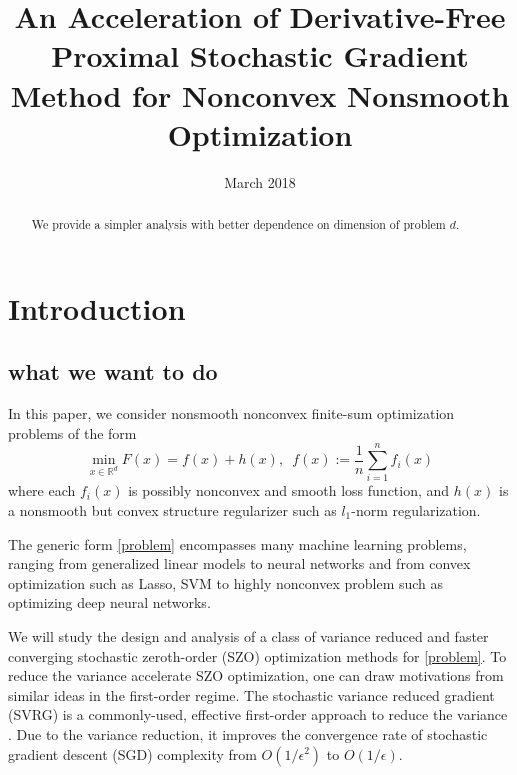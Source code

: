 \documentclass{article}
\title{An Acceleration of Derivative-Free Proximal Stochastic Gradient Method for Nonconvex Nonsmooth Optimization}
\date{March 2018}
\newcommand*{\R}{\mathbb{R}}
\theoremstyle{definition}
\theoremstyle{remark}
\begin{document}
\maketitle
\begin{abstract}
We provide a simpler analysis with better dependence on dimension of problem $d$. 
\end{abstract}

\section{Introduction}
\subsection{what we want to do}
{\color{Green}\label{problem}
{\color{Violet}
In this paper, we consider nonsmooth nonconvex finite-sum optimization problems of the form
}
\begin{equation}
\min_{x\in\R^d} F(x) =  f(x) + h(x),\,\,\,f(x):=\frac{1}{n}\sum_{i=1}^n f_i(x)
\end{equation}
where each $f_i(x)$ is {\color{Violet} possibly} nonconvex and smooth loss function, and $h(x)$ is a nonsmooth but convex structure regularizer such as $l_1$-norm regularization. }
{\color{Brown}
The generic form \eqref{problem} encompasses
many machine learning problems, ranging from generalized linear models to neural networks 
{\color{Violet} and from convex optimization such as Lasso, SVM to highly nonconvex problem such as optimizing deep neural networks.}


We will study the design and analysis of {\color{Green} a class of} variance reduced and faster converging stochastic zeroth-order (SZO) optimization methods for \eqref{problem}. To reduce the variance accelerate SZO optimization, one can draw
motivations from similar ideas in the first-order regime. The stochastic variance reduced gradient
(SVRG) is a commonly-used, effective first-order approach to reduce the variance \cite{johnson2013accelerating,reddi2016stochastic,nitanda2016accelerated,allen2016improved,lei2017non}. Due to
the variance
reduction, it improves the convergence rate of stochastic gradient descent (SGD) complexity from
$O(1/\epsilon^2)$ to $O(1/{\epsilon})$.


}
\end{document}
